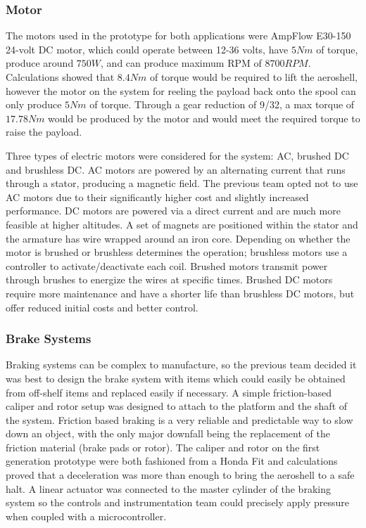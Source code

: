 \subsubsection{Motor}

\indent\indent The motors used in the prototype for both applications were AmpFlow E30-150 24-volt DC motor, which could operate between 12-36 volts, have $5 Nm$ of torque, produce around $750 W$, and can produce maximum RPM of $8700 RPM$. Calculations showed that $8.4 Nm$ of torque would be required to lift the aeroshell, however the motor on the system for reeling the payload back onto the spool can only produce $5 Nm$ of torque. Through a gear reduction of 9/32, a max torque of $17.78 Nm$ would be produced by the motor and would meet the required torque to raise the payload.

Three types of electric motors were considered for the system: AC, brushed DC and brushless DC. AC motors are powered by an alternating current that runs through a stator, producing a magnetic field. The previous team opted not to use AC motors due to their significantly higher cost and slightly increased performance. DC motors are powered via a direct current and are much more feasible at higher altitudes. A set of magnets are positioned within the stator and the armature has wire wrapped around an iron core. Depending on whether the motor is brushed or brushless determines the operation; brushless motors use a controller to activate/deactivate each coil. Brushed motors transmit power through brushes to energize the wires at specific times. Brushed DC motors require more maintenance and have a shorter life than brushless DC motors, but offer reduced initial costs and better control.


\subsubsection{Brake Systems}

\indent\indent Braking systems can be complex to manufacture, so the previous team decided it was best to design the brake system with items which could easily be obtained from off-shelf items and replaced easily if necessary. A simple friction-based caliper and rotor setup was designed to attach to the platform and the shaft of the system. Friction based braking is a very reliable and predictable way to slow down an object, with the only major downfall being the replacement of the friction material (brake pads or rotor). The caliper and rotor on the first generation prototype were both fashioned from a Honda Fit and calculations proved that a deceleration was more than enough to bring the aeroshell to a safe halt. A linear actuator was connected to the master cylinder of the braking system so the controls and instrumentation team could precisely apply pressure when coupled with a microcontroller.


